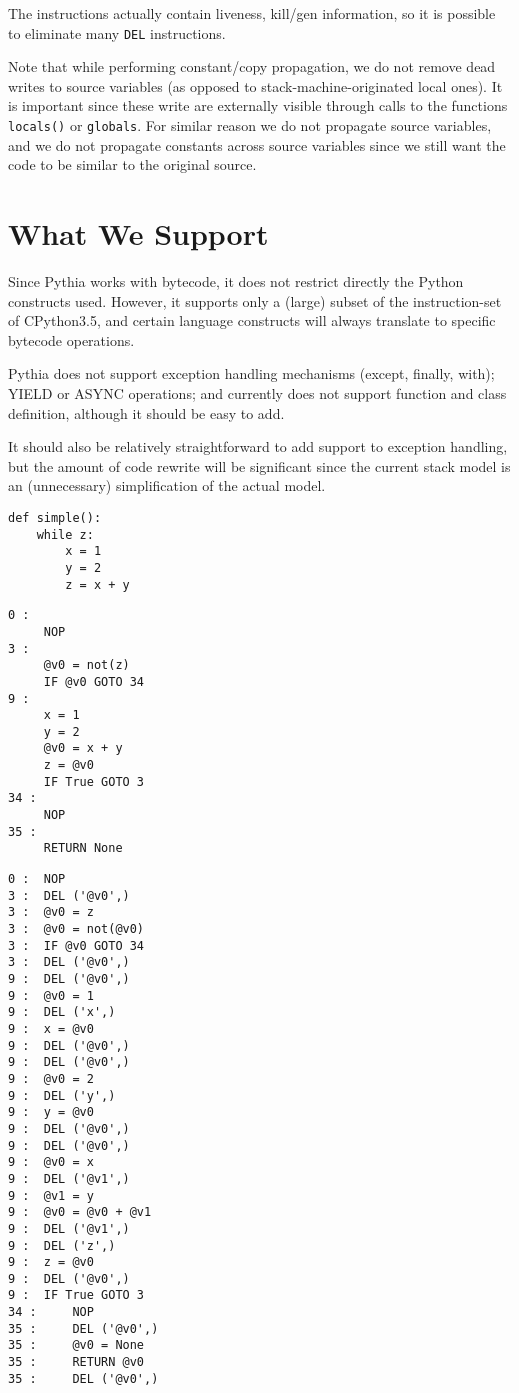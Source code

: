 \documentclass[a4paper]{article}
\begin{document}
The instructions actually contain liveness, kill/gen information, so it is possible to eliminate many \texttt{DEL} instructions.

Note that while performing constant/copy propagation, we do not remove dead writes to source variables (as opposed to stack-machine-originated local ones). It is important since these write are externally visible through calls to the functions \texttt{locals()} or \texttt{globals}. For similar reason we do not propagate source variables, and we do not propagate constants across source variables since we still want the code to be similar to the original source.

\section{What We Support}
Since Pythia works with bytecode, it does not restrict directly the Python constructs used. However, it supports only a (large) subset of the instruction-set of CPython3.5, and certain language constructs will always translate to specific bytecode operations.

Pythia does not support exception handling mechanisms (except, finally, with); YIELD or ASYNC operations; and currently does not support function and class definition, although it should be easy to add.

It should also be relatively straightforward to add support to exception handling, but the amount of code rewrite will be significant since the current stack model is an (unnecessary) simplification of the actual model.
\newpage
\twocolumn
{}
\begin{lstlisting}
def simple():
    while z:
        x = 1
        y = 2
        z = x + y
\end{lstlisting}
\begin{lstlisting}
0 :
	 NOP
3 :
	 @v0 = not(z)
	 IF @v0 GOTO 34
9 :
	 x = 1
	 y = 2
	 @v0 = x + y
	 z = @v0
	 IF True GOTO 3
34 :
	 NOP
35 :
	 RETURN None
\end{lstlisting}
\newpage
{}
\begin{lstlisting}
0 :	 NOP
3 :	 DEL ('@v0',)
3 :	 @v0 = z
3 :	 @v0 = not(@v0)
3 :	 IF @v0 GOTO 34
3 :	 DEL ('@v0',)
9 :	 DEL ('@v0',)
9 :	 @v0 = 1
9 :	 DEL ('x',)
9 :	 x = @v0
9 :	 DEL ('@v0',)
9 :	 DEL ('@v0',)
9 :	 @v0 = 2
9 :	 DEL ('y',)
9 :	 y = @v0
9 :	 DEL ('@v0',)
9 :	 DEL ('@v0',)
9 :	 @v0 = x
9 :	 DEL ('@v1',)
9 :	 @v1 = y
9 :	 @v0 = @v0 + @v1
9 :	 DEL ('@v1',)
9 :	 DEL ('z',)
9 :	 z = @v0
9 :	 DEL ('@v0',)
9 :	 IF True GOTO 3
34 :	 NOP
35 :	 DEL ('@v0',)
35 :	 @v0 = None
35 :	 RETURN @v0
35 :	 DEL ('@v0',)
\end{lstlisting}
\end{document}
